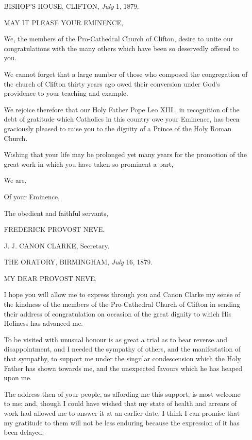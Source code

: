 
BISHOP'S HOUSE, CLIFTON,
\emph{July} 1, 1879.

MAY IT PLEASE
YOUR EMINENCE,

We, the members of the Pro-Cathedral Church of Clifton, desire to
unite our congratulations with the many others which have been so
deservedly offered to you.

We cannot forget that a large number of those who composed the
congregation of the church of Clifton thirty years ago owed their
conversion under God's providence to your teaching and example.

We rejoice therefore that our Holy Father Pope Leo XIII., in
recognition of the debt of gratitude which Catholics in this country
owe your Eminence, has been graciously pleased to raise you to the
dignity of a Prince of the Holy Roman Church.

Wishing that your life may be prolonged yet many years for the
promotion of the great work in which you have taken so prominent a
part,

We are,

Of your Eminence,

The obedient and faithful servants,

FREDERICK PROVOST NEVE.

J. J. CANON CLARKE,
Secretary.


THE ORATORY, BIRMINGHAM,
\emph{July} 16, 1879.

MY DEAR PROVOST
NEVE,

I hope you will allow me to express through you and Canon Clarke my
sense of the kindness of the members of the Pro-Cathedral Church of
Clifton in sending their address of congratulation on occasion of the
great dignity to which His Holiness has advanced me.

To be visited with unusual honour is as great a trial as to bear
reverse and disappointment, and I needed the sympathy of others, and
the manifestation of that sympathy, to support me under the singular
condescension which the Holy Father has shown towards me, and the
unexpected favours which he has heaped upon me.

The address then of your people, as affording me this support, is
most welcome to me; and, though I could have wished that my state of
health and arrears of work had allowed me to answer it at an earlier
date, I think I can promise that my gratitude to them will not be less
enduring because the expression of it has been delayed.

